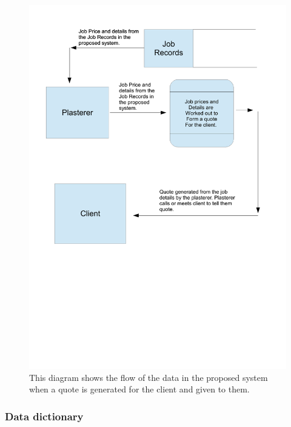 \begin{figure}[H]
\includegraphics[width=\textwidth]{./Analysis/images/proposedSystemGeneratingQuoteForClient.pdf}
    \caption{This diagram shows the flow of the data in the proposed system when a quote is generated for the client and given to them.} \label{fig:proposed_system_dfd_5}
\end{figure}




\subsubsection{Data dictionary}


